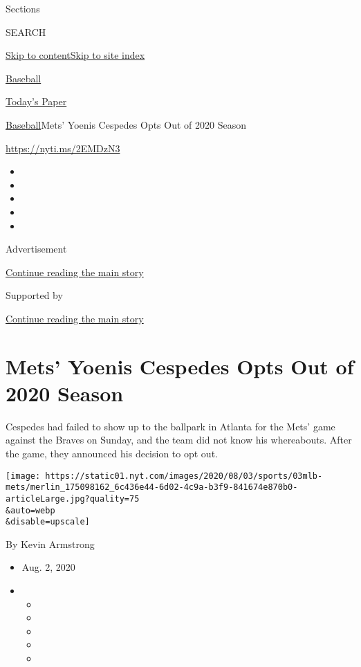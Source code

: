 Sections

SEARCH

\protect\hyperlink{site-content}{Skip to
content}\protect\hyperlink{site-index}{Skip to site index}

\href{https://www.nytimes.com/section/sports/baseball}{Baseball}

\href{https://myaccount.nytimes.com/auth/login?response_type=cookie\&client_id=vi}{}

\href{https://www.nytimes.com/section/todayspaper}{Today's Paper}

\href{/section/sports/baseball}{Baseball}\textbar{}Mets' Yoenis Cespedes
Opts Out of 2020 Season

\url{https://nyti.ms/2EMDzN3}

\begin{itemize}
\item
\item
\item
\item
\item
\end{itemize}

Advertisement

\protect\hyperlink{after-top}{Continue reading the main story}

Supported by

\protect\hyperlink{after-sponsor}{Continue reading the main story}

\hypertarget{mets-yoenis-cespedes-opts-out-of-2020-season}{%
\section{Mets' Yoenis Cespedes Opts Out of 2020
Season}\label{mets-yoenis-cespedes-opts-out-of-2020-season}}

Cespedes had failed to show up to the ballpark in Atlanta for the Mets'
game against the Braves on Sunday, and the team did not know his
whereabouts. After the game, they announced his decision to opt out.

\texttt{[image: https://static01.nyt.com/images/2020/08/03/sports/03mlb-mets/merlin\_175098162\_6c436e44-6d02-4c9a-b3f9-841674e870b0-articleLarge.jpg?quality=75\\\&auto=webp\\\&disable=upscale]}

By Kevin Armstrong

\begin{itemize}
\item
  Aug. 2, 2020
\item
  \begin{itemize}
  \item
  \item
  \item
  \item
  \item
  \end{itemize}
\end{itemize}

